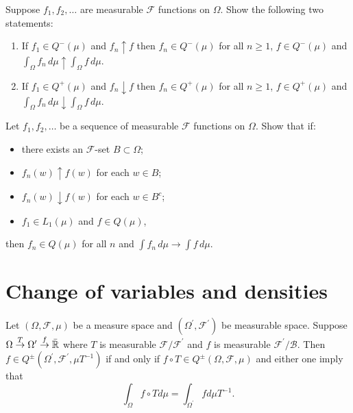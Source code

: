 \begin{exercise}
Suppose $f_1, f_2, \ldots$ are measurable $\mathcal F$ functions on $\Omega$.
Show the following two statements:
\begin{enumerate}
\item If $f_1\in Q^-(\mu)$ and $f_n\uparrow f$ then $f_n\in Q^-(\mu)$ for all $n\geq 1$, $f\in Q^-(\mu)$ and $\int_\Omega f_n \,d\mu \uparrow \int_\Omega f \, d\mu$.
\item If $f_1\in Q^+(\mu)$ and $f_n\downarrow f$ then $f_n\in Q^+(\mu)$ for all $n\geq 1$, $f\in Q^+(\mu)$ and $\int_\Omega f_n \,d\mu \downarrow \int_\Omega f \, d\mu$.
\end{enumerate}
\end{exercise}

\begin{exercise}
Let $f_1, f_2, \ldots$ be a sequence of measurable $\mathcal F$ functions on $\Omega$. Show that if:
\begin{itemize}
\item there exists an $\mathcal F$-set $B\subset \Omega$;
\item $f_n(w)\uparrow f(w)$ for each $w\in B$;
\item $f_n(w)\downarrow f(w)$ for each $w\in B^c$;
\item $f_1\in L_1(\mu)$ and $f\in Q(\mu)$,
\end{itemize}
then $f_n\in Q(\mu)$ for all $n$ and $\int f_n \,d\mu \rightarrow \int f \,d\mu$.
\end{exercise}


\clearpage
\section{Change of variables and densities}


\begin{theorem}
\label{thm: change of variables}
Let $(\Omega, \mathcal F,\mu)$ be a measure space and $(\Omega^\prime, \mathcal F^\prime)$ be measurable space.
Suppose \mbox{$\Omega \overset T \rightarrow \Omega^\prime \overset f \rightarrow \bar{\Bbb R}$} where $
T$ is measurable $\mathcal F/\mathcal F^\prime$ and $f$ is measurable $\mathcal F^\prime/\mathcal B$. Then \mbox{$f\in Q^\pm(\Omega^\prime, \mathcal F^\prime, \mu T^{-1})$} if and only if \mbox{$f\circ T\in Q^\pm(\Omega, \mathcal F, \mu)$} and either one imply that
\[  \int_\Omega f\circ T d\mu = \int_{\Omega^\prime} f d\mu T^{-1}. \]
\end{theorem}

